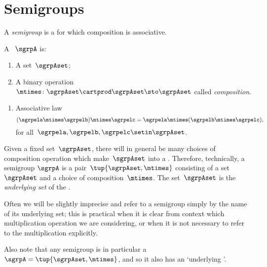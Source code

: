
\section{Semigroups}
\label{sec:semigroups}
A \emph{semigroup} is a  for which composition is associative.

\begin{ctdefinition}[Semigroup]
    \label{def:semigroup}
    A \emph{}~$\sgrpA$ is:
    \begin{body}
        \constit
        \begin{enumerate}
            \item A set~$\sgrpAset$;
            \item A binary operation~$\mtimes  \colon \sgrpAset \cartprod \sgrpAset \sto \sgrpAset$ called \emph{composition}.
        \end{enumerate}
        \condit
        \begin{enumerate}
            \item Associative law
                  \begin{equation}
                      \label{eq:semigroup-associative}
                      (\sgrpela \mtimes   \sgrpelb)\mtimes   \sgrpelc
                      = \sgrpela \mtimes   (\sgrpelb \mtimes  \sgrpelc),
                  \end{equation}
                  for all~$\sgrpela, \sgrpelb, \sgrpelc \setin \sgrpAset$.
        \end{enumerate}
    \end{body}
\end{ctdefinition}

\begin{remark}
    Given a fixed set~$\sgrpAset$, there will in general be many choices of composition operation which make~$\sgrpAset$ into a .
    Therefore, technically, a semigroup $\sgrpA$ is a pair~$\tup{\sgrpAset, \mtimes}$ consisting of a set~$\sgrpAset$ and a choice of composition~$\mtimes$.
    The set~$\sgrpAset$ is the \emph{underlying set} of the .

    Often we will be slightly imprecise and refer to a semigroup simply by the name of its underlying set;
    this is practical when it is clear from context which multiplication operation we are considering, or when it is not necessary to refer to the multiplication explicitly.

    Also note that any semigroup is in particular a ~$\sgrpA = \tup{\sgrpAset, \mtimes}$, and so it also has an `underlying '.
\end{remark}

